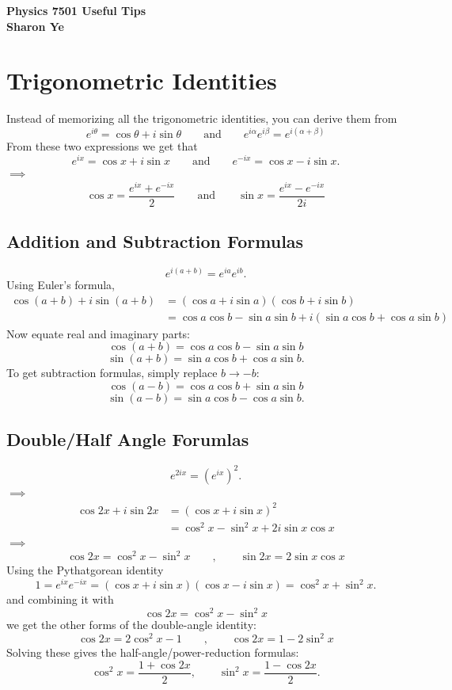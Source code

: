 \documentclass[11pt, answers]{exam}
\begin{document}
	\begin{center}
		\Large \bf Physics 7501 Useful Tips \\ Sharon Ye
	\end{center}

    \section{Trigonometric Identities}
    Instead of memorizing all the trigonometric identities, you can derive them from
    \[
    e^{i\theta}=\cos\theta+i\sin\theta \qquad\text{and}\qquad
    e^{i\alpha}e^{i\beta}=e^{i(\alpha+\beta)}
    \]
    From these two expressions we get that
    \[
    e^{ix}=\cos x+i\sin x\qquad\text{and}\qquad
    e^{-ix}=\cos x-i\sin x.
    \]
    $\implies$
    \[
    \boxed{\cos x=\frac{e^{ix}+e^{-ix}}{2}}\qquad\text{and}\qquad
    \boxed{\sin x=\frac{e^{ix}-e^{-ix}}{2i}}
    \]
    \subsection{Addition and Subtraction Formulas}
    \[
    e^{i(a+b)}=e^{ia}e^{ib}.
    \]
    Using Euler's formula,
    \begin{align*}
        \cos(a+b)+i\sin(a+b) &=(\cos a+i\sin a)(\cos b+i\sin b) \\
        &=\cos a\cos b-\sin a\sin b+i(\sin a\cos b+\cos a\sin b)
    \end{align*}
    Now equate real and imaginary parts:
    \[
    \boxed{\cos(a+b)=\cos a\cos b-\sin a\sin b}
    \]\[
    \boxed{\sin(a+b)=\sin a\cos b+\cos a\sin b}.
    \]To get subtraction formulas, simply replace \(b\to-b\):
    \[
    \boxed{\cos(a-b)=\cos a\cos b+\sin a\sin b}
    \]\[
    \boxed{\sin(a-b)=\sin a\cos b-\cos a\sin b}.
    \]

    \subsection{Double/Half Angle Forumlas}
    \[
    e^{2ix}=(e^{ix})^2.
    \]
    $\implies$
    \begin{align*}
        \cos 2x+i\sin 2x &= (\cos x+i\sin x)^2 \\
        &=\cos^2x-\sin^2x+2i\sin x\cos x
    \end{align*}
    $\implies$
    \[
    \boxed{\cos 2x=\cos^2x-\sin^2x}\qquad,\qquad
    \boxed{\sin 2x=2\sin x\cos x}
    \]
    Using the Pythatgorean identity
    \[
    1=e^{ix}e^{-ix}=(\cos x+i\sin x)(\cos x-i\sin x)
    =
    \cos^2x+\sin^2x.
    \]
    and combining it with
    \[
    \cos 2x=\cos^2x-\sin^2x
    \]
    we get the other forms of the double-angle identity:
    \[
    \boxed{\cos2x=2\cos^2x-1}\qquad,\qquad
    \boxed{\cos2x=1-2\sin^2x}
    \]Solving these gives the half-angle/power-reduction formulas:
    \[
    \boxed{\cos^2x=\frac{1+\cos2x}{2}},
    \qquad
    \boxed{\sin^2x=\frac{1-\cos2x}{2}}.
    \]
    
\end{document}
